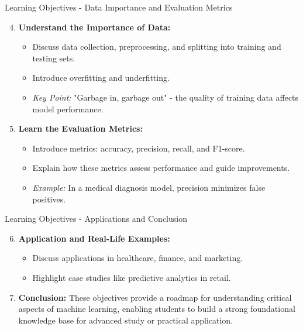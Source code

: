 \documentclass[aspectratio=169]{beamer}
\begin{document}
\begin{frame}[fragile]{Learning Objectives - Data Importance and Evaluation Metrics}
    \begin{enumerate}
        \setcounter{enumi}{3}
        
        \item \textbf{Understand the Importance of Data:}
        \begin{itemize}
            \item Discuss data collection, preprocessing, and splitting into training and testing sets.
            \item Introduce overfitting and underfitting.
            \item \textit{Key Point:} "Garbage in, garbage out" - the quality of training data affects model performance.
        \end{itemize}
        
        \item \textbf{Learn the Evaluation Metrics:}
        \begin{itemize}
            \item Introduce metrics: accuracy, precision, recall, and F1-score.
            \item Explain how these metrics assess performance and guide improvements.
            \item \textit{Example:} In a medical diagnosis model, precision minimizes false positives.
        \end{itemize}
    \end{enumerate}
\end{frame}

\begin{frame}[fragile]{Learning Objectives - Applications and Conclusion}
    \begin{enumerate}
        \setcounter{enumi}{5}
        
        \item \textbf{Application and Real-Life Examples:}
        \begin{itemize}
            \item Discuss applications in healthcare, finance, and marketing.
            \item Highlight case studies like predictive analytics in retail.
        \end{itemize}
        
        \item \textbf{Conclusion:}
        These objectives provide a roadmap for understanding critical aspects of machine learning, enabling students to build a strong foundational knowledge base for advanced study or practical application.
    \end{enumerate}
\end{frame}
\end{document}
